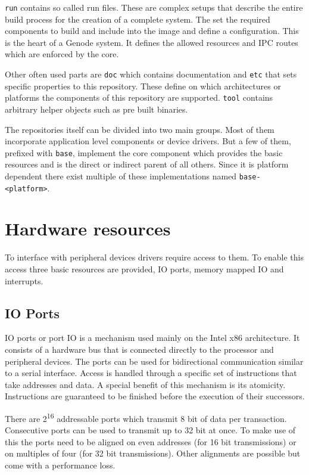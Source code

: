 \documentclass[
a4paper,
12pt,
notitlepage,
parskip=half,
DIV=11,
]{scrbook}
\begin{document}
		\texttt{run} contains so called run files.
		These are complex setups that describe the entire build process for the creation of a complete system.
		The set the required components to build and include into the image and define a configuration.
		This is the heart of a Genode system.
		It defines the allowed resources and IPC routes which are enforced by the core.
		
		Other often used parts are \texttt{doc} which contains documentation and \texttt{etc} that sets specific properties to this repository.
		These define on which architectures or platforms the components of this repository are supported.
		\texttt{tool} contains arbitrary helper objects such as pre built binaries.
		
		The repositories itself can be divided into two main groups.
		Most of them incorporate application level components or device drivers.
		But a few of them, prefixed with \texttt{base}, implement the core component which provides the basic resources and is the direct or indirect parent of all others.
		Since it is platform dependent there exist multiple of these implementations named \texttt{base-<platform>}. \citep{genode}
		
		\section{Hardware resources}
		\label{hwres}
		
		To interface with peripheral devices drivers require access to them.
		To enable this access three basic resources are provided, IO ports, memory mapped IO and interrupts.
		
		\subsection{IO Ports}
		
		IO ports or port IO is a mechanism used mainly on the Intel x86 architecture.
		It consists of a hardware bus that is connected directly to the processor and peripheral devices.
		The ports can be used for bidirectional communication similar to a serial interface.
		Access is handled through a specific set of instructions that take addresses and data.
		A special benefit of this mechanism is its atomicity.
		Instructions are guaranteed to be finished before the execution of their successors.
		
		There are 2\textsuperscript{16} addressable ports which transmit 8 bit of data per transaction.
		Consecutive ports can be used to transmit up to 32 bit at once.
		To make use of this the ports need to be aligned on even addresses (for 16 bit transmissions) or on multiples of four (for 32 bit transmissions).
		Other alignments are possible but come with a performance loss.
		
\end{document}
